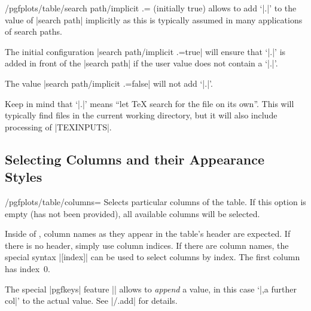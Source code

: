 \documentclass[a4paper]{ltxdoc}
\begin{document}
\begin{key}{/pgfplots/table/search path/implicit .= (initially true)}
    \PGFPlotstable{} allows to add `|.|' to the value of |search path|
    implicitly as this is typically assumed in many applications of search
    paths.

    The initial configuration |search path/implicit .=true| will ensure that
    `|.|' is added in front of the |search path| if the user value does not
    contain a `|.|'.

    The value |search path/implicit .=false| will not add `|.|'.

    Keep in mind that `|.|' means ``let \TeX{} search for the file on its
    own''. This will typically find files in the current working directory, but
    it will also include processing of |TEXINPUTS|.
\end{key}


\subsection{Selecting Columns and their Appearance Styles}

\begin{key}{/pgfplots/table/columns=}
    Selects particular columns of the table. If this option is empty (has not
    been provided), all available columns will be selected.

    Inside of , column names as they appear in the
    table's header are expected. If there is no header, simply use column
    indices. If there are column names, the special syntax
    |[index]| can be used to select columns by index. The first
    column has index~$0$.
\begin{codeexample}[]
\end{codeexample}

    The special |pgfkeys| feature
    || allows to
    \emph{append} a value, in this case `|,a further col|' to the actual value.
    See |/.add| for details.
\end{key}
\end{document}
